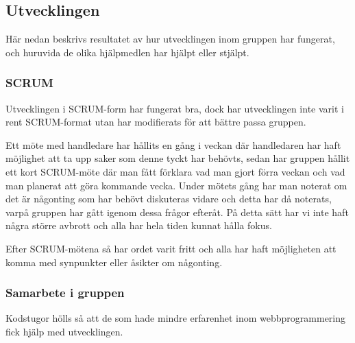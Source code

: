
\subsection{Utvecklingen}
Här nedan beskrivs resultatet av hur utvecklingen inom gruppen har fungerat,
och huruvida de olika hjälpmedlen har hjälpt eller stjälpt.

\subsubsection{SCRUM}
Utvecklingen i SCRUM-form har fungerat bra,
dock har utvecklingen inte varit i rent SCRUM-format utan har modifierats för att bättre passa gruppen.

Ett möte med handledare har hållits en gång i veckan där handledaren har haft möjlighet att ta upp saker som denne tyckt har behövts,
sedan har gruppen hållit ett kort SCRUM-möte där man fått förklara vad man gjort förra veckan och vad man planerat
att göra kommande vecka. Under mötets gång har man noterat om det är någonting som har behövt diskuteras
vidare och detta har då noterats, varpå gruppen har gått igenom dessa frågor efteråt. På detta sätt har vi inte haft några större avbrott och alla har hela tiden kunnat hålla fokus.

Efter SCRUM-mötena så har ordet varit fritt och alla har haft möjligheten att komma med synpunkter eller åsikter om någonting.

\subsubsection{Samarbete i gruppen}
Kodstugor hölls så att de som hade mindre erfarenhet inom webbprogrammering fick hjälp med utvecklingen.

